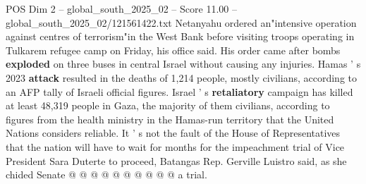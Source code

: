 \begin{textsample}{POS Dim 2 – global\_south\_2025\_02 – Score 11.00 – global\_south\_2025\_02/121561422.txt}
Netanyahu ordered an"intensive operation against centres of terrorism"in the West Bank before visiting troops operating in Tulkarem refugee camp on Friday, his office said.
His order came after bombs \textbf{exploded} on three buses in central Israel without causing any injuries.
Hamas ' s 2023 \textbf{attack} resulted in the deaths of 1,214 people, mostly civilians, according to an AFP tally of Israeli official figures.
Israel ' s \textbf{retaliatory} campaign has killed at least 48,319 people in Gaza, the majority of them civilians, according to figures from the health ministry in the Hamas-run territory that the United Nations considers reliable.
It ' s not the fault of the House of Representatives that the nation will have to wait for months for the impeachment trial of Vice President Sara Duterte to proceed, Batangas Rep.
Gerville Luistro said, as she chided Senate @ @ @ @ @ @ @ @ @ @ a trial.

\end{textsample}
